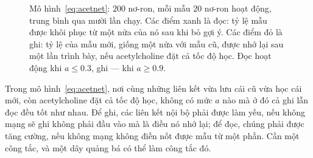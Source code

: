 \begin{figure}[t]
\centering
{}
\caption{Mô hình~\eqref{eq:acetnet}: $200$ nơ-ron, mỗi mẫu $20$ nơ-ron hoạt động, trung bình qua mười lần chạy. Các điểm xanh là đọc: tỷ lệ mẫu được khôi phục từ một nửa của nó sau khi bỏ gợi ý. Các điểm đỏ là ghi: tỷ lệ của mẫu mới, giống một nửa với mẫu cũ, được nhớ lại sau một lần trình bày, nếu acetylcholine đặt cả tốc độ học. Đọc hoạt động khi $a\le0.3$, ghi --- khi $a\ge0.9$.}
\label{fig:acetsim}
\end{figure}

\begin{keyblock}
\begin{proposition}
\label{prop:writeread}
Trong mô hình~\eqref{eq:acetnet}, nơi cùng những liên kết vừa lưu cái cũ vừa học cái mới, còn acetylcholine đặt cả tốc độ học, không có mức $a$ nào mà ở đó cả ghi lẫn đọc đều tốt như nhau. Để ghi, các liên kết nội bộ phải được làm yếu, nếu không mạng sẽ ghi không phải đầu vào mà là điều nó nhớ lại; để đọc, chúng phải được tăng cường, nếu không mạng không điền nốt được mẫu từ một phần. Cần một công tắc, và một dây quảng bá có thể làm công tắc đó.
\end{proposition}
\end{keyblock}

